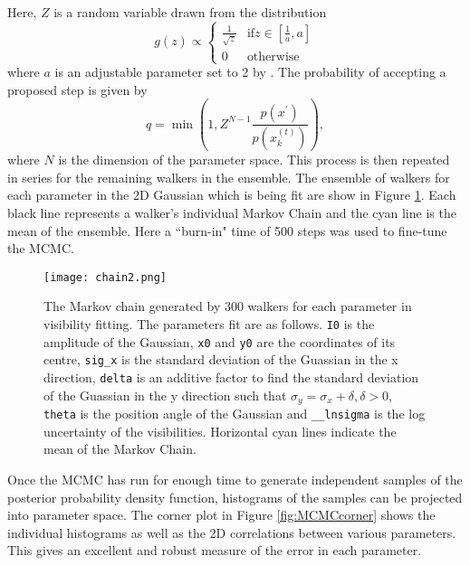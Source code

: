 Here, $Z$ is a random variable drawn from the distribution
\begin{equation}
\label{eq:MCMC_g}
g(z) \propto 
\begin{cases}
\frac{1}{\sqrt{z}} & \mbox{if} z \in \left[\frac{1}{a}, a \right] \\
0 & \mbox{otherwise}
\end{cases}
\end{equation}
where $a$ is an adjustable parameter set to 2 by \cite{Goodman2010}. The probability of accepting a proposed step is given by
\begin{equation}
\label{eq:MCMC_stretch_newstate}
q = \min \left(1, Z^{N-1} \frac{p(x^\prime)}{p(x_k^{(t)})}\right),
\end{equation} 
where $N$ is the dimension of the parameter space. This process is then repeated in series for the remaining walkers in the ensemble.
The ensemble of walkers for each parameter in the 2D Gaussian which is being fit are show in Figure \ref{fig:MCMCchain}. Each black line represents a walker's individual Markov Chain and the cyan line is the mean of the ensemble. Here a ``burn-in" time of 500 steps was used to fine-tune the MCMC. 
\begin{figure}[ht]
\centering
\texttt{[image: chain2.png]}
\caption[The Markov chain generated by 300 walkers for each parameter in visibility fitting.]{The Markov chain generated by 300 walkers for each parameter in visibility fitting. The parameters fit are as follows. \texttt{I0} is the amplitude of the Gaussian, \texttt{x0} and \texttt{y0} are the coordinates of its centre, \texttt{sig\_x} is the standard deviation of the Guassian in the x direction, \texttt{delta} is an additive factor to find the standard deviation of the Guassian in the y direction such that $\sigma_y = \sigma_x + \delta, \delta > 0$, \texttt{theta} is the position angle of the Gaussian and \texttt{\_\_lnsigma} is the log uncertainty of the visibilities. Horizontal cyan lines indicate the mean of the Markov Chain.}
\label{fig:MCMCchain}
\end{figure}

Once the MCMC has run for enough time to generate independent samples of the posterior probability density function, histograms of the samples can be projected into parameter space. The corner plot in Figure \ref{fig:MCMCcorner} shows the individual histograms as well as the 2D correlations between various parameters. This gives an excellent and robust measure of the error in each parameter.

